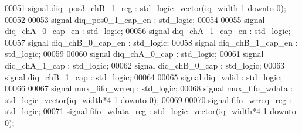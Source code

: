 \begin{DoxyCode}
00051 \textcolor{keywordflow}{signal} \textcolor{vhdlchar}{diq_pos3_chB_1_reg}  \textcolor{vhdlchar}{:} \textcolor{comment}{std\_logic\_vector}\textcolor{vhdlchar}{(}\textcolor{vhdlchar}{iq_width}\textcolor{vhdlchar}{-}\textcolor{vhdllogic}{}\textcolor{vhdllogic}{1} \textcolor{keywordflow}{downto} \textcolor{vhdllogic}{}\textcolor{vhdllogic}{0}\textcolor{vhdlchar}{)};
00052 
00053 \textcolor{keywordflow}{signal} \textcolor{vhdlchar}{diq_pos0_1_cap_en}    \textcolor{vhdlchar}{:} \textcolor{comment}{std\_logic};
00054 
00055 \textcolor{keywordflow}{signal} \textcolor{vhdlchar}{diq_chA_0_cap_en}    \textcolor{vhdlchar}{:} \textcolor{comment}{std\_logic};
00056 \textcolor{keywordflow}{signal} \textcolor{vhdlchar}{diq_chA_1_cap_en}    \textcolor{vhdlchar}{:} \textcolor{comment}{std\_logic};
00057 \textcolor{keywordflow}{signal} \textcolor{vhdlchar}{diq_chB_0_cap_en}    \textcolor{vhdlchar}{:} \textcolor{comment}{std\_logic};
00058 \textcolor{keywordflow}{signal} \textcolor{vhdlchar}{diq_chB_1_cap_en}    \textcolor{vhdlchar}{:} \textcolor{comment}{std\_logic};
00059 
00060 \textcolor{keywordflow}{signal} \textcolor{vhdlchar}{diq_chA_0_cap}       \textcolor{vhdlchar}{:} \textcolor{comment}{std\_logic};
00061 \textcolor{keywordflow}{signal} \textcolor{vhdlchar}{diq_chA_1_cap}       \textcolor{vhdlchar}{:} \textcolor{comment}{std\_logic};
00062 \textcolor{keywordflow}{signal} \textcolor{vhdlchar}{diq_chB_0_cap}       \textcolor{vhdlchar}{:} \textcolor{comment}{std\_logic};
00063 \textcolor{keywordflow}{signal} \textcolor{vhdlchar}{diq_chB_1_cap}       \textcolor{vhdlchar}{:} \textcolor{comment}{std\_logic};
00064 
00065 \textcolor{keywordflow}{signal} \textcolor{vhdlchar}{diq_valid}              \textcolor{vhdlchar}{:} \textcolor{comment}{std\_logic};
00066 
00067 \textcolor{keywordflow}{signal} \textcolor{vhdlchar}{mux_fifo_wrreq}   \textcolor{vhdlchar}{:} \textcolor{comment}{std\_logic};
00068 \textcolor{keywordflow}{signal} \textcolor{vhdlchar}{mux_fifo_wdata}   \textcolor{vhdlchar}{:} \textcolor{comment}{std\_logic\_vector}\textcolor{vhdlchar}{(}\textcolor{vhdlchar}{iq_width}\textcolor{vhdlchar}{*}\textcolor{vhdllogic}{4-1} \textcolor{keywordflow}{downto} \textcolor{vhdllogic}{}\textcolor{vhdllogic}{0}\textcolor{vhdlchar}{)};
00069 
00070 \textcolor{keywordflow}{signal} \textcolor{vhdlchar}{fifo_wrreq_reg}   \textcolor{vhdlchar}{:} \textcolor{comment}{std\_logic};
00071 \textcolor{keywordflow}{signal} \textcolor{vhdlchar}{fifo_wdata_reg}   \textcolor{vhdlchar}{:} \textcolor{comment}{std\_logic\_vector}\textcolor{vhdlchar}{(}\textcolor{vhdlchar}{iq_width}\textcolor{vhdlchar}{*}\textcolor{vhdllogic}{4-1} \textcolor{keywordflow}{downto} \textcolor{vhdllogic}{}\textcolor{vhdllogic}{0}\textcolor{vhdlchar}{)};

\end{DoxyCode}
